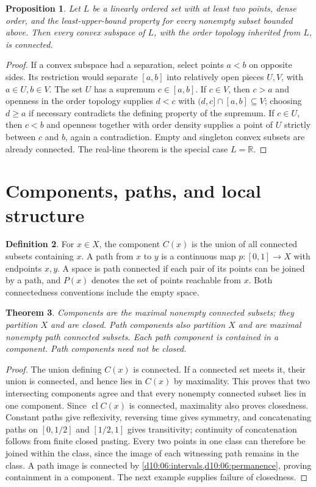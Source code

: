 \documentclass[11pt,oneside,openany]{book}
\newtheorem{theorem}{Theorem}[chapter]
\newtheorem{proposition}[theorem]{Proposition}
\theoremstyle{definition}
\newtheorem{definition}[theorem]{Definition}
\theoremstyle{remark}
\newcommand{\R}{\mathbb R}\newcommand{\C}{\mathbb C}
\DeclareMathOperator{\cl}{cl}
\begin{document}
\begin{proposition}\label{d10:06:linear-continuum}
Let $L$ be a linearly ordered set with at least two points, dense order, and the least-upper-bound property for every nonempty subset bounded above. Then every convex subspace of $L$, with the order topology inherited from $L$, is connected.
\end{proposition}
\begin{proof}
If a convex subspace had a separation, select points $a<b$ on opposite sides. Its restriction would separate $[a,b]$ into relatively open pieces $U,V$, with $a\in U,b\in V$. The set $U$ has a supremum $c\in[a,b]$. If $c\in V$, then $c>a$ and openness in the order topology supplies $d<c$ with $(d,c]\cap[a,b]\subseteq V$; choosing $d\geq a$ if necessary contradicts the defining property of the supremum. If $c\in U$, then $c<b$ and openness together with order density supplies a point of $U$ strictly between $c$ and $b$, again a contradiction. Empty and singleton convex subsets are already connected. The real-line theorem is the special case $L=\R$.
\end{proof}

\section{Components, paths, and local structure}
\begin{definition}\label{d10:06:components}
For $x\in X$, the component $C(x)$ is the union of all connected subsets containing $x$. A path from $x$ to $y$ is a continuous map $p:[0,1]\to X$ with endpoints $x,y$. A space is path connected if each pair of its points can be joined by a path, and $P(x)$ denotes the set of points reachable from $x$. Both connectedness conventions include the empty space.
\end{definition}

\begin{theorem}\label{d10:06:component-partition}
Components are the maximal nonempty connected subsets; they partition $X$ and are closed. Path components also partition $X$ and are maximal nonempty path connected subsets. Each path component is contained in a component. Path components need not be closed.
\end{theorem}
\begin{proof}
The union defining $C(x)$ is connected. If a connected set meets it, their union is connected, and hence lies in $C(x)$ by maximality. This proves that two intersecting components agree and that every nonempty connected subset lies in one component. Since $\cl C(x)$ is connected, maximality also proves closedness. Constant paths give reflexivity, reversing time gives symmetry, and concatenating paths on $[0,1/2]$ and $[1/2,1]$ gives transitivity; continuity of concatenation follows from finite closed pasting. Every two points in one class can therefore be joined within the class, since the image of each witnessing path remains in the class. A path image is connected by \cref{d10:06:intervals,d10:06:permanence}, proving containment in a component. The next example supplies failure of closedness.
\end{proof}
\end{document}
